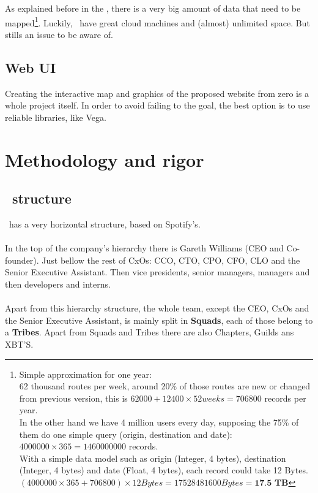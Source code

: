As explained before in the , there is a very big amount of data that need to be mapped\footnote{Simple approximation for one year:
\\
62 thousand routes per week, around 20\% of those routes are new or changed from previous version, this is $62000+12400\times 52 weeks = 706800$ records per year.
\\
In the other hand we have 4 million users every day, supposing the 75\% of them do one simple query (origin, destination and date): $4000000\times365=1460000000$ records.
\\
With a simple data model such as origin (Integer, 4 bytes), destination (Integer, 4 bytes) and date (Float, 4 bytes), each record could take 12 Bytes.
\\
$(4000000\times365+706800)\times12 Bytes = 17528481600 Bytes = \textbf{17.5 TB}$}. Luckily, \company\ have great cloud machines and (almost) unlimited space. But stills an issue to be aware of.

\subsection{Web UI}

Creating the interactive map and graphics of the proposed website from zero is a whole project itself. In order to avoid failing to the  goal, the best option is to use reliable libraries, like Vega\cite{vega}.


\section{Methodology and rigor}

\subsection{\company\ structure} \label{company_structure}

\company\ has a very horizontal structure, based on Spotify's\cite{culture_of_growth}.
\\\\
In the top of the company's hierarchy there is Gareth Williams (CEO and Co-founder). Just bellow the rest of CxOs: CCO, CTO, CPO, CFO, CLO and the Senior Executive Assistant. Then vice presidents, senior managers, managers and then developers and interns\cite{crew_chart}.
\\\\
Apart from this hierarchy structure, the whole team, except the CEO, CxOs and the Senior Executive Assistant, is mainly split in \textbf{Squads}, each of those belong to a \textbf{Tribes}. Apart from Squads and Tribes there are also Chapters, Guilds ans XBT'S\cite{how_skyscanner_works}.

